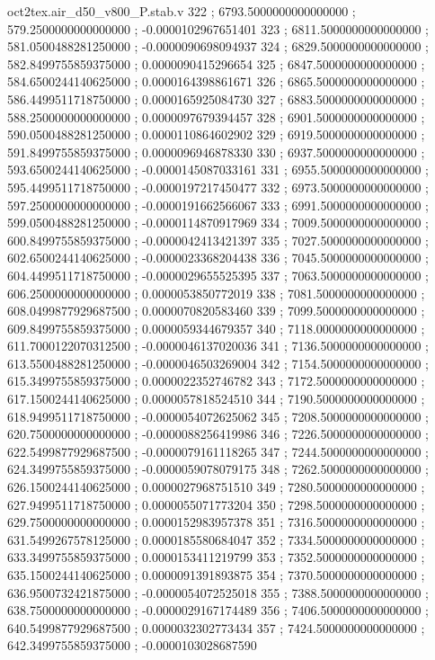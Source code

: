 \begin{filecontents}[overwrite]{oct2tex.air_d50_v800_P.stab.v}
322 ; 6793.5000000000000000 ; 579.2500000000000000 ; -0.0000102967651401
323 ; 6811.5000000000000000 ; 581.0500488281250000 ; -0.0000090698094937
324 ; 6829.5000000000000000 ; 582.8499755859375000 ; 0.0000090415296654
325 ; 6847.5000000000000000 ; 584.6500244140625000 ; 0.0000164398861671
326 ; 6865.5000000000000000 ; 586.4499511718750000 ; 0.0000165925084730
327 ; 6883.5000000000000000 ; 588.2500000000000000 ; 0.0000097679394457
328 ; 6901.5000000000000000 ; 590.0500488281250000 ; 0.0000110864602902
329 ; 6919.5000000000000000 ; 591.8499755859375000 ; 0.0000096946878330
330 ; 6937.5000000000000000 ; 593.6500244140625000 ; -0.0000145087033161
331 ; 6955.5000000000000000 ; 595.4499511718750000 ; -0.0000197217450477
332 ; 6973.5000000000000000 ; 597.2500000000000000 ; -0.0000191662566067
333 ; 6991.5000000000000000 ; 599.0500488281250000 ; -0.0000114870917969
334 ; 7009.5000000000000000 ; 600.8499755859375000 ; -0.0000042413421397
335 ; 7027.5000000000000000 ; 602.6500244140625000 ; -0.0000023368204438
336 ; 7045.5000000000000000 ; 604.4499511718750000 ; -0.0000029655525395
337 ; 7063.5000000000000000 ; 606.2500000000000000 ; 0.0000053850772019
338 ; 7081.5000000000000000 ; 608.0499877929687500 ; 0.0000070820583460
339 ; 7099.5000000000000000 ; 609.8499755859375000 ; 0.0000059344679357
340 ; 7118.0000000000000000 ; 611.7000122070312500 ; -0.0000046137020036
341 ; 7136.5000000000000000 ; 613.5500488281250000 ; -0.0000046503269004
342 ; 7154.5000000000000000 ; 615.3499755859375000 ; 0.0000022352746782
343 ; 7172.5000000000000000 ; 617.1500244140625000 ; 0.0000057818524510
344 ; 7190.5000000000000000 ; 618.9499511718750000 ; -0.0000054072625062
345 ; 7208.5000000000000000 ; 620.7500000000000000 ; -0.0000088256419986
346 ; 7226.5000000000000000 ; 622.5499877929687500 ; -0.0000079161118265
347 ; 7244.5000000000000000 ; 624.3499755859375000 ; -0.0000059078079175
348 ; 7262.5000000000000000 ; 626.1500244140625000 ; 0.0000027968751510
349 ; 7280.5000000000000000 ; 627.9499511718750000 ; 0.0000055071773204
350 ; 7298.5000000000000000 ; 629.7500000000000000 ; 0.0000152983957378
351 ; 7316.5000000000000000 ; 631.5499267578125000 ; 0.0000185580684047
352 ; 7334.5000000000000000 ; 633.3499755859375000 ; 0.0000153411219799
353 ; 7352.5000000000000000 ; 635.1500244140625000 ; 0.0000091391893875
354 ; 7370.5000000000000000 ; 636.9500732421875000 ; -0.0000054072525018
355 ; 7388.5000000000000000 ; 638.7500000000000000 ; -0.0000029167174489
356 ; 7406.5000000000000000 ; 640.5499877929687500 ; 0.0000032302773434
357 ; 7424.5000000000000000 ; 642.3499755859375000 ; -0.0000103028687590

\end{filecontents}
